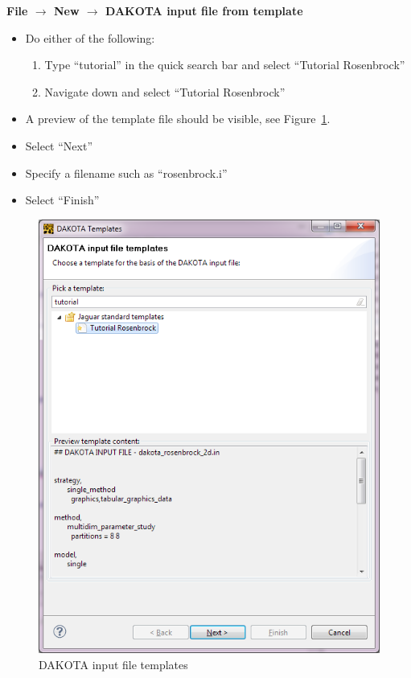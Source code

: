 {\bf File $\rightarrow$ New $\rightarrow$ DAKOTA input file from template}
\begin{itemize}
\item Do either of the following:
\begin{enumerate}
\item Type ``tutorial'' in the quick search bar and select ``Tutorial Rosenbrock''
\item Navigate down and select ``Tutorial Rosenbrock''
\end{enumerate}
\item A preview of the template file should be visible, see Figure~\ref{fig:input:1tutorial}.
\item Select ``Next''
\item Specify a filename such as ``rosenbrock.i''
\item Select ``Finish''
\end{itemize}
\begin{figure}[htbp]
  \centering
  \includegraphics[scale=0.6]{images/1tutorial}
  \caption{DAKOTA input file templates}
  \label{fig:input:1tutorial}
\end{figure}


